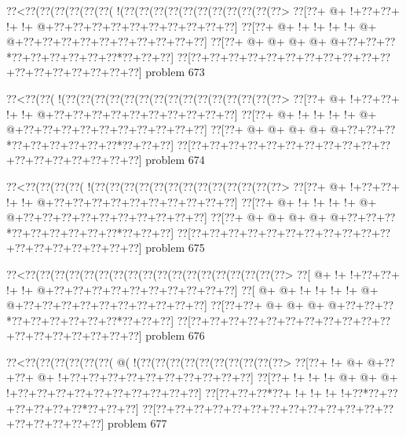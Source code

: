 \vbox{\vbox{\goo
\0??<\0??(\0??(\0??(\0??(\0??(\0??(\- !(\0??(\0??(\0??(\0??(\0??(\0??(\0??(\0??(\0??(\0??(\0??>
\0??[\0??+\- @+\- !+\0??+\0??+\- !+\- !+\- @+\0??+\0??+\0??+\0??+\0??+\0??+\0??+\0??+\0??+\0??]
\0??[\0??+\- @+\- !+\- !+\- !+\- !+\- @+\- @+\0??+\0??+\0??+\0??+\0??+\0??+\0??+\0??+\0??+\0??]
\0??[\0??+\- @+\- @+\- @+\- @+\- @+\0??+\0??+\0??*\0??+\0??+\0??+\0??+\0??+\0??*\0??+\0??+\0??]
\0??[\0??+\0??+\0??+\0??+\0??+\0??+\0??+\0??+\0??+\0??+\0??+\0??+\0??+\0??+\0??+\0??+\0??+\0??]
}
\hfil problem 673\hfil\break
}



\vbox{\vbox{\goo
\0??<\0??(\0??(\- !(\0??(\0??(\0??(\0??(\0??(\0??(\0??(\0??(\0??(\0??(\0??(\0??(\0??(\0??(\0??>
\0??[\0??+\- @+\- !+\0??+\0??+\- !+\- !+\- @+\0??+\0??+\0??+\0??+\0??+\0??+\0??+\0??+\0??+\0??]
\0??[\0??+\- @+\- !+\- !+\- !+\- !+\- @+\- @+\0??+\0??+\0??+\0??+\0??+\0??+\0??+\0??+\0??+\0??]
\0??[\0??+\- @+\- @+\- @+\- @+\- @+\0??+\0??+\0??*\0??+\0??+\0??+\0??+\0??+\0??*\0??+\0??+\0??]
\0??[\0??+\0??+\0??+\0??+\0??+\0??+\0??+\0??+\0??+\0??+\0??+\0??+\0??+\0??+\0??+\0??+\0??+\0??]
}
\hfil problem 674\hfil\break
}



\vbox{\vbox{\goo
\0??<\0??(\0??(\0??(\0??(\- !(\0??(\0??(\0??(\0??(\0??(\0??(\0??(\0??(\0??(\0??(\0??(\0??(\0??>
\0??[\0??+\- @+\- !+\0??+\0??+\- !+\- !+\- @+\0??+\0??+\0??+\0??+\0??+\0??+\0??+\0??+\0??+\0??]
\0??[\0??+\- @+\- !+\- !+\- !+\- !+\- @+\- @+\0??+\0??+\0??+\0??+\0??+\0??+\0??+\0??+\0??+\0??]
\0??[\0??+\- @+\- @+\- @+\- @+\- @+\0??+\0??+\0??*\0??+\0??+\0??+\0??+\0??+\0??*\0??+\0??+\0??]
\0??[\0??+\0??+\0??+\0??+\0??+\0??+\0??+\0??+\0??+\0??+\0??+\0??+\0??+\0??+\0??+\0??+\0??+\0??]
}
\hfil problem 675\hfil\break
}



\vbox{\vbox{\goo
\0??<\0??(\0??(\0??(\0??(\0??(\0??(\0??(\0??(\0??(\0??(\0??(\0??(\0??(\0??(\0??(\0??(\0??(\0??>
\0??[\- @+\- !+\- !+\0??+\0??+\- !+\- !+\- @+\0??+\0??+\0??+\0??+\0??+\0??+\0??+\0??+\0??+\0??]
\0??[\- @+\- @+\- !+\- !+\- !+\- !+\- @+\- @+\0??+\0??+\0??+\0??+\0??+\0??+\0??+\0??+\0??+\0??]
\0??[\0??+\0??+\- @+\- @+\- @+\- @+\0??+\0??+\0??*\0??+\0??+\0??+\0??+\0??+\0??*\0??+\0??+\0??]
\0??[\0??+\0??+\0??+\0??+\0??+\0??+\0??+\0??+\0??+\0??+\0??+\0??+\0??+\0??+\0??+\0??+\0??+\0??]
}
\hfil problem 676\hfil\break
}



\vbox{\vbox{\goo
\0??<\0??(\0??(\0??(\0??(\0??(\0??(\- @(\- !(\0??(\0??(\0??(\0??(\0??(\0??(\0??(\0??(\0??(\0??>
\0??[\0??+\- !+\- @+\- @+\0??+\0??+\- @+\- !+\0??+\0??+\0??+\0??+\0??+\0??+\0??+\0??+\0??+\0??]
\0??[\0??+\- !+\- !+\- !+\- @+\- @+\- @+\- !+\0??+\0??+\0??+\0??+\0??+\0??+\0??+\0??+\0??+\0??]
\0??[\0??+\0??+\0??*\0??+\- !+\- !+\- !+\- !+\0??*\0??+\0??+\0??+\0??+\0??+\0??*\0??+\0??+\0??]
\0??[\0??+\0??+\0??+\0??+\0??+\0??+\0??+\0??+\0??+\0??+\0??+\0??+\0??+\0??+\0??+\0??+\0??+\0??]
}
\hfil problem 677\hfil\break
}




